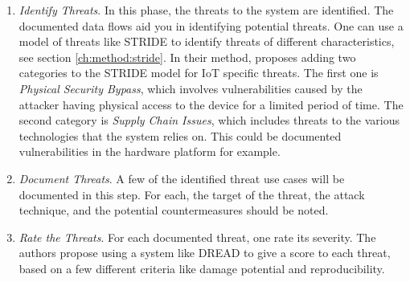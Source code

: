 \begin{enumerate}
    \item \textit{Identify Threats}. In this phase, the threats to the system are identified. The documented data flows aid you in identifying potential threats. One can use a model of threats like STRIDE\cite{stride} to identify threats of different characteristics, see section \ref{ch:method:stride}. In their method, \citeauthor{guzman2017iot} proposes adding two categories to the STRIDE model for IoT specific threats. The first one is \textit{Physical Security Bypass}, which involves vulnerabilities caused by the attacker having physical access to the device for a limited period of time. The second category is \textit{Supply Chain Issues}, which includes threats to the various technologies that the system relies on. This could be documented vulnerabilities in the hardware platform for example.
    \item \textit{Document Threats}. A few of the identified threat use cases will be documented in this step. For each, the target of the threat, the attack technique, and the potential countermeasures should be noted.
    \item \textit{Rate the Threats}. For each documented threat, one rate its severity. The authors propose using a system like DREAD to give a score to each threat, based on a few different criteria like damage potential and reproducibility.
\end{enumerate}

